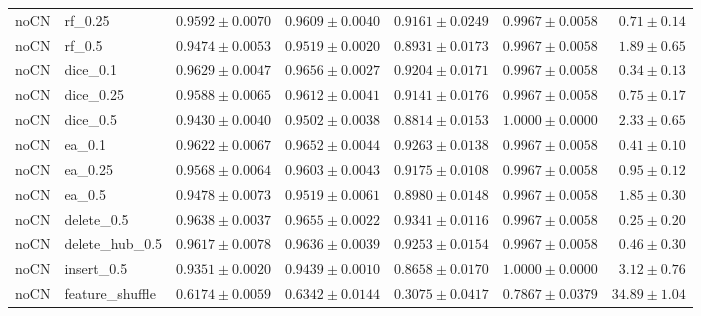\documentclass[UTF8,a4paper,11pt,fontset=fandol]{ctexart}
\begin{document}
{\begin{longtable}{llrrrrr}
noCN & rf\_0.25 & $0.9592\pm0.0070$ & $0.9609\pm0.0040$ & $0.9161\pm0.0249$ & $0.9967\pm0.0058$ & $0.71\pm0.14$ \\
noCN & rf\_0.5 & $0.9474\pm0.0053$ & $0.9519\pm0.0020$ & $0.8931\pm0.0173$ & $0.9967\pm0.0058$ & $1.89\pm0.65$ \\
noCN & dice\_0.1 & $0.9629\pm0.0047$ & $0.9656\pm0.0027$ & $0.9204\pm0.0171$ & $0.9967\pm0.0058$ & $0.34\pm0.13$ \\
noCN & dice\_0.25 & $0.9588\pm0.0065$ & $0.9612\pm0.0041$ & $0.9141\pm0.0176$ & $0.9967\pm0.0058$ & $0.75\pm0.17$ \\
noCN & dice\_0.5 & $0.9430\pm0.0040$ & $0.9502\pm0.0038$ & $0.8814\pm0.0153$ & $1.0000\pm0.0000$ & $2.33\pm0.65$ \\
noCN & ea\_0.1 & $0.9622\pm0.0067$ & $0.9652\pm0.0044$ & $0.9263\pm0.0138$ & $0.9967\pm0.0058$ & $0.41\pm0.10$ \\
noCN & ea\_0.25 & $0.9568\pm0.0064$ & $0.9603\pm0.0043$ & $0.9175\pm0.0108$ & $0.9967\pm0.0058$ & $0.95\pm0.12$ \\
noCN & ea\_0.5 & $0.9478\pm0.0073$ & $0.9519\pm0.0061$ & $0.8980\pm0.0148$ & $0.9967\pm0.0058$ & $1.85\pm0.30$ \\
noCN & delete\_0.5 & $0.9638\pm0.0037$ & $0.9655\pm0.0022$ & $0.9341\pm0.0116$ & $0.9967\pm0.0058$ & $0.25\pm0.20$ \\
noCN & delete\_hub\_0.5 & $0.9617\pm0.0078$ & $0.9636\pm0.0039$ & $0.9253\pm0.0154$ & $0.9967\pm0.0058$ & $0.46\pm0.30$ \\
noCN & insert\_0.5 & $0.9351\pm0.0020$ & $0.9439\pm0.0010$ & $0.8658\pm0.0170$ & $1.0000\pm0.0000$ & $3.12\pm0.76$ \\
noCN & feature\_shuffle & $0.6174\pm0.0059$ & $0.6342\pm0.0144$ & $0.3075\pm0.0417$ & $0.7867\pm0.0379$ & $34.89\pm1.04$ \\
\end{longtable}
}
\end{document}
